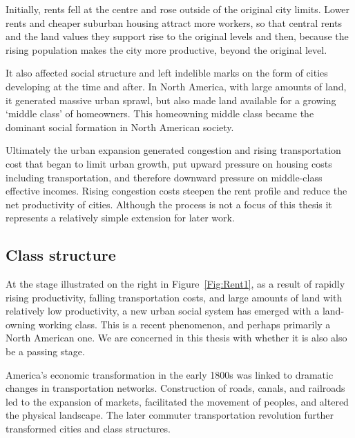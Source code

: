 
Initially, rents fell at the centre and rose outside of the original city limits. Lower rents and cheaper suburban housing attract more workers, so that central rents and the land values they support  rise to the original levels and then, because the rising population makes the city more productive, beyond the original level. 

It  also affected social structure and left indelible marks on the form of cities developing at the time and after. In North America, with large amounts of land, it generated massive urban sprawl, but also made land available for a growing `middle class' of homeowners. This homeowning middle class became the dominant social formation in North 
American society. 

Ultimately the urban expansion generated congestion and rising transportation cost that began to limit urban growth, put upward pressure on  housing costs including transportation, and therefore downward pressure on middle-class effective incomes. Rising congestion costs steepen the rent profile and  reduce the net productivity of cities. Although the process is not a focus of this thesis it represents a relatively simple extension for later work.


\subsection{Class structure}\label{Sec:ClassStucture}

At the stage illustrated on the right  in Figure~\ref{Fig:Rent1},  %
as a result of rapidly rising productivity, falling transportation costs, and large amounts of land with relatively low productivity, a new urban social system has emerged with a land-owning working class. This is a recent phenomenon, and perhaps primarily a North American one. We are concerned in this thesis with whether it is also also be a passing stage.

America's economic transformation in the early 1800s was linked to dramatic changes in transportation networks. Construction of roads, canals, and railroads led to the expansion of markets, facilitated the movement of peoples, and altered the physical landscape. The later commuter transportation revolution  further transformed cities and class structures.



